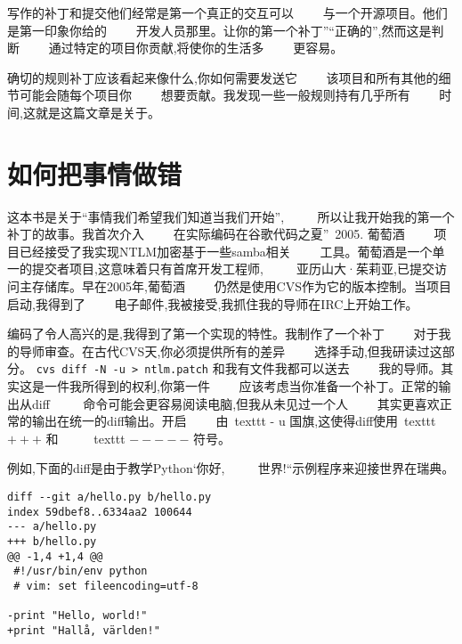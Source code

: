 

\noindent{}写作的补丁和提交他们经常是第一个真正的交互可以　　
与一个开源项目。他们是第一印象你给的　　
开发人员那里。让你的第一个补丁”“正确的”,然而这是判断　　
通过特定的项目你贡献,将使你的生活多　　
更容易。

确切的规则补丁应该看起来像什么,你如何需要发送它　　
该项目和所有其他的细节可能会随每个项目你　　
想要贡献。我发现一些一般规则持有几乎所有　　
时间,这就是这篇文章是关于。

\section*{如何把事情做错}

这本书是关于“事情我们希望我们知道当我们开始”, 　　
所以让我开始我的第一个补丁的故事。我首次介入　　
在实际编码在谷歌代码之夏”\texttrademark ~2005. 葡萄酒　　
项目已经接受了我实现NTLM加密基于一些samba相关　　
工具。葡萄酒是一个单一的提交者项目,这意味着只有首席开发工程师, 　　
亚历山大·茱莉亚,已提交访问主存储库。早在2005年,葡萄酒　　
仍然是使用CVS作为它的版本控制。当项目启动,我得到了　　
电子邮件,我被接受,我抓住我的导师在IRC上开始工作。

编码了令人高兴的是,我得到了第一个实现的特性。我制作了一个补丁　　
对于我的导师审查。在古代CVS天,你必须提供所有的差异　　
选择手动,但我研读过这部分。
\mbox{\texttt{cvs diff -N -u > ntlm.patch}} 和我有文件我都可以送去　　
我的导师。其实这是一件我所得到的权利,你第一件　　
应该考虑当你准备一个补丁。正常的输出从diff 　　
命令可能会更容易阅读电脑,但我从未见过一个人　　
其实更喜欢正常的输出在统一的diff输出。开启　　
由\ texttt { - u }国旗,这使得diff使用\ texttt { $ + + + $ }和　　
\ texttt { $ - - - - - $ }符号。

例如,下面的diff是由于教学Python‘你好, 　　
世界!“示例程序来迎接世界在瑞典。

\begin{verbatim}
diff --git a/hello.py b/hello.py
index 59dbef8..6334aa2 100644
--- a/hello.py
+++ b/hello.py
@@ -1,4 +1,4 @@
 #!/usr/bin/env python
 # vim: set fileencoding=utf-8

-print "Hello, world!"
+print "Hallå, världen!"
\end{verbatim}

